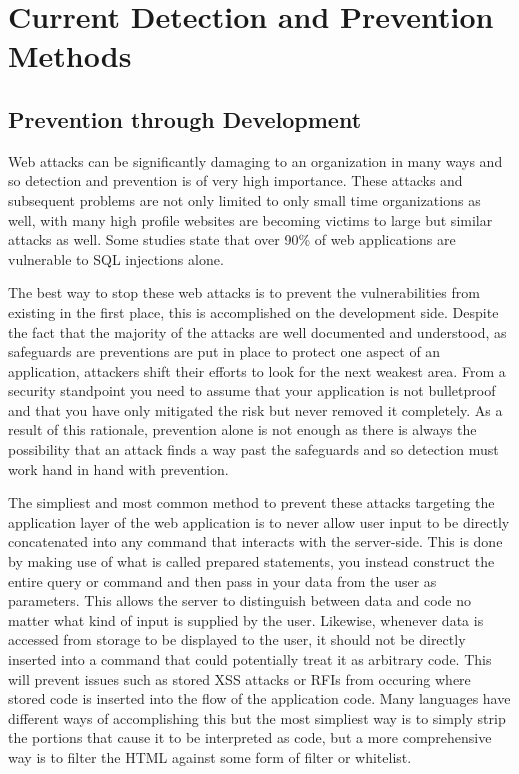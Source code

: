 \chapter{Current Detection and Prevention Methods} \label{sec:sectionThree}

\section{Prevention through Development} \label{sec:preventDevel}

Web attacks can be significantly damaging to an organization in many ways and so detection and prevention is of very high importance.  These attacks and subsequent problems are not only limited to only small time organizations as well, with many high profile websites are becoming victims to large but similar attacks as well.  Some studies state that over 90\% of web applications are vulnerable to SQL injections alone. \cite{detectionAndPreventionSQL}

The best way to stop these web attacks is to prevent the vulnerabilities from existing in the first place, this is accomplished on the development side.  Despite the fact that the majority of the attacks are well documented and understood, as safeguards are preventions are put in place to protect one aspect of an application, attackers shift their efforts to look for the next weakest area.  From a security standpoint you need to assume that your application is not bulletproof and that you have only mitigated the risk but never removed it completely.  As a result of this rationale, prevention alone is not enough as there is always the possibility that an attack finds a way past the safeguards and so detection must work hand in hand with prevention.

The simpliest and most common method to prevent these attacks targeting the application layer of the web application is to never allow user input to be directly concatenated into any command that interacts with the server-side.  This is done by making use of what is called prepared statements, you instead construct the entire query or command and then pass in your data from the user as parameters.  This allows the server to distinguish between data and code no matter what kind of input is supplied by the user.  Likewise, whenever data is accessed from storage to be displayed to the user, it should not be directly inserted into a command that could potentially treat it as arbitrary code.  This will prevent issues such as stored XSS attacks or RFIs from occuring where stored code is inserted into the flow of the application code.  \cite{owaspSQLPrevention}  Many languages have different ways of accomplishing this but the most simpliest way is to simply strip the portions that cause it to be interpreted as code, but a more comprehensive way is to filter the HTML against some form of filter or whitelist. \cite{htmlPurifier}

